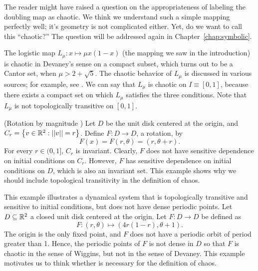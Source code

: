 \documentclass[10pt,draft,twoside]{book}
\begin{document}
The reader might have raised a question on the appropriateness of labeling the doubling map as chaotic.
We think we understand such a simple mapping perfectly well; it's geometry is not complicated either.
Yet, do we want to call this ``chaotic?''
The question will be addressed again in Chapter~\ref{chap:symbolic}.
\begin{example}
  The logistic map $L_\mu: x \mapsto \mu x(1-x)$ (the mapping we saw in the introduction) is chaotic in Devaney's sense on a compact subset, which turns out to be a Cantor set, when $\mu > 2 + \sqrt{5}$.
  The chaotic behavior of $L_\mu$ is discussed in various sources; for example, see \citet{sternberg}.
  We can say that $L_\mu$ is chaotic on $I \equiv [0,1]$, because there exists a compact set on which $L_\mu$ satisfies the three conditions.
  Note that $L_\mu$ is not topologically transitive on $[0,1]$.
\end{example} 
\begin{example}
  (Rotation by magnitude \citep{martelli})
  Let $D$ be the unit disk centered at the origin, and $C_r = \left \{ v \in \mathbb{R}^2: \left|\left| v \right|\right| = r \right \}$.
  Define $F: D \to D$, a rotation, by 
  \begin{equation*}
    F(x) = F(r, \theta) = (r, \theta + r).
  \end{equation*}
For every $r \in (0,1]$, $C_r$ is invariant.
Clearly, $F$ does not have sensitive dependence on initial conditions on $C_r$.
However, $F$ has sensitive dependence on initial conditions on $D$, which is also an invariant set. 
This example shows why we should include topological transitivity in the definition of chaos.
\end{example}
\begin{example}
  \citep{martelli}
  This example illustrates a dynamical system that is topologically transitive and sensitive to initial conditions, but does not have dense periodic points.
  Let $D \subseteq \mathbb{R}^2$ a closed unit disk centered at the origin.
  Let $F: D \to D$ be defined as
  \begin{equation*}
    F: (r, \theta) \mapsto (4r(1 - r), \theta + 1).
  \end{equation*}
  The origin is the only fixed point, and $F$ does not have a periodic orbit of period greater than 1.
  Hence, the periodic points of $F$ is not dense in $D$ so that $F$ is chaotic in the sense of Wiggins, but not in the sense of Devaney.
  This example motivates us to think whether \dpp is necessary for the definition of chaos.
  \label{eg:notdpp}
\end{example}
\end{document}
